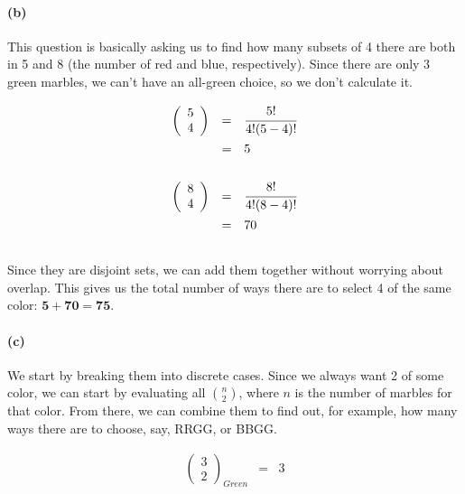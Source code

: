 \documentclass[a4paper]{article}
\begin{document}
\paragraph{(b)} This question is basically asking us to find how many subsets of 4 there are both in 5 and 8 (the number of red and blue, respectively). Since there are only 3 green marbles, we can't have an all-green choice, so we don't calculate it.

\begin{equation}
\begin{array}{rll}
\left ( \begin{array}{c} 5 \\ 4 \end{array} \right ) & = & \cfrac{5!}{4!(5-4)!} \\[.15in]
& = & 5 \\[.1in]
\end{array}
\end{equation}

\begin{equation}
\begin{array}{rll}
\left ( \begin{array}{c} 8 \\ 4 \end{array} \right ) & = & \cfrac{8!}{4!(8-4)!} \\[.15in]
& = & 70 \\[.15in]
\end{array}
\end{equation}

Since they are disjoint sets, we can add them together without worrying about overlap. This gives us the total number of ways there are to select 4 of the same color: $\mathbf{5+70=75}$.

\paragraph{(c)} We start by breaking them into discrete cases. Since we always want 2 of some color, we can start by evaluating all $n \choose 2$, where $n$ is the number of marbles for that color. From there, we can combine them to find out, for example, how many ways there are to choose, say, RRGG, or BBGG.

\begin{equation}
\begin{array}{rll}
\left ( \begin{array}{c} 3 \\ 2 \end{array} \right )_{Green} & = & 3 \\[.15in]
\end{array}
\end{equation}
\end{document}
